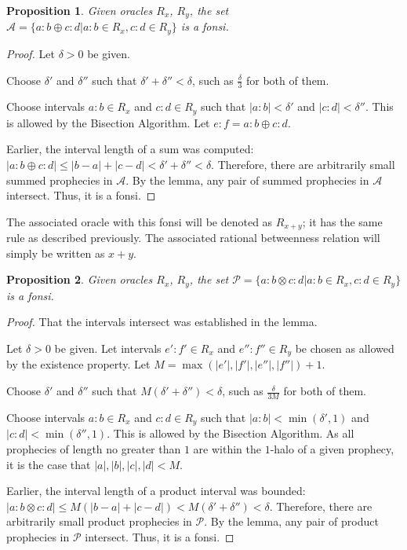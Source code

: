 \documentclass[12pt]{article}
\newtheorem{proposition}{Proposition}[section]
\begin{document}
\begin{proposition}
    Given oracles $R_x$, $R_y$, the set $\mathcal{A} = \{a:b \oplus c:d| a:b \in R_x, c:d \in R_y\}$ is a fonsi. 
\end{proposition}

\begin{proof}

    Let $\delta > 0$ be given. 

    Choose $\delta'$ and $\delta''$ such that $\delta' + \delta'' < \delta$, such as $\frac{\delta}{3}$ for both of them. 

    Choose intervals $a:b \in R_x$ and $c:d \in R_y$  such that  $|a:b| < \delta'$ and $|c:d| < \delta''$. This is allowed by the Bisection Algorithm. Let $e:f = a:b \oplus c:d$.
     
    Earlier, the interval length of a sum was computed:  $|a:b \oplus c:d| \leq |b-a| + |c-d| < \delta' + \delta'' < \delta$. Therefore, there are arbitrarily small summed prophecies in $\mathcal{A}$. By the lemma, any pair of summed prophecies in $\mathcal{A}$ intersect. Thus, it is a fonsi. 
    
\end{proof}


The associated oracle with this fonsi will be denoted as $R_{x + y}$; it has the same rule as described previously. The associated rational betweenness relation will simply be written as $x+y$. 

\begin{proposition}
    Given oracles $R_x$, $R_y$, the set $\mathcal{P} = \{a:b \otimes c:d| a:b \in R_x, c:d \in R_y\}$ is a fonsi. 
\end{proposition}

\begin{proof}
    That the intervals intersect was established in the lemma. 

    Let $\delta > 0$ be given. Let intervals $e':f' \in R_x$ and $e'':f'' \in R_y$ be chosen as allowed by the existence property. Let $M = \max(|e'|, |f'|, |e''|, |f''|) +1$. 

    Choose $\delta'$ and $\delta''$ such that $M(\delta' + \delta'') < \delta$, such as $\frac{\delta}{3M}$ for both of them. 

    Choose intervals $a:b \in R_x$ and $c:d \in R_y$  such that  $|a:b| < \min(\delta', 1)$ and $|c:d| < \min(\delta'', 1)$. This is allowed by the Bisection Algorithm. As all prophecies of length no greater than $1$ are within the $1$-halo of a given prophecy, it is the case that $|a|, |b|, |c|, |d| < M$. 
     
    Earlier, the interval length of a product interval was bounded:  $|a:b \otimes c:d| \leq M (|b-a| + |c-d|) < M (\delta' + \delta'') < \delta$. Therefore, there are arbitrarily small product prophecies in $\mathcal{P}$. By the lemma, any pair of product prophecies in $\mathcal{P}$ intersect. Thus, it is a fonsi. 
    
\end{proof}
\end{document}
